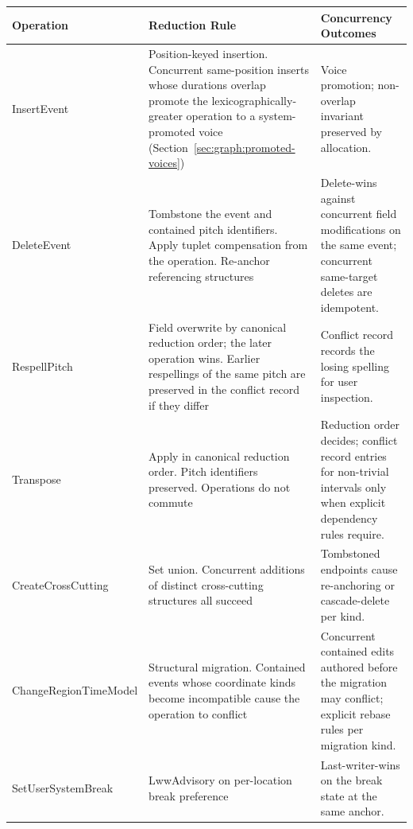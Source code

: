 \documentclass[11pt,letterpaper]{report}
\begin{document}
\begin{longtable}{p{3.4cm} p{4.0cm} p{5.0cm}}
  \toprule
  \textbf{Operation} & \textbf{Reduction Rule} &
  \textbf{Concurrency Outcomes} \\
  \midrule
  \endhead

  InsertEvent &
  Position-keyed insertion. Concurrent same-position inserts whose
  durations overlap promote the lexicographically-greater operation
  to a system-promoted voice
  (Section~\ref{sec:graph:promoted-voices}) &
  Voice promotion; non-overlap invariant preserved by allocation. \\

  DeleteEvent &
  Tombstone the event and contained pitch identifiers. Apply
  tuplet compensation from the operation. Re-anchor referencing
  structures &
  Delete-wins against concurrent field modifications on the same
  event; concurrent same-target deletes are idempotent. \\

  RespellPitch &
  Field overwrite by canonical reduction order; the later operation
  wins. Earlier respellings of the same pitch are preserved in the
  conflict record if they differ &
  Conflict record records the losing spelling for user inspection. \\

  Transpose &
  Apply in canonical reduction order. Pitch identifiers preserved.
  Operations do not commute &
  Reduction order decides; conflict record entries for non-trivial
  intervals only when explicit dependency rules require. \\

  CreateCrossCutting &
  Set union. Concurrent additions of distinct cross-cutting
  structures all succeed &
  Tombstoned endpoints cause re-anchoring or cascade-delete per
  kind. \\

  ChangeRegionTimeModel &
  Structural migration. Contained events whose coordinate kinds
  become incompatible cause the operation to conflict &
  Concurrent contained edits authored before the migration may
  conflict; explicit rebase rules per migration kind. \\

  SetUserSystemBreak &
  LwwAdvisory on per-location break preference &
  Last-writer-wins on the break state at the same anchor. \\

  \bottomrule
\end{longtable}
\end{document}

